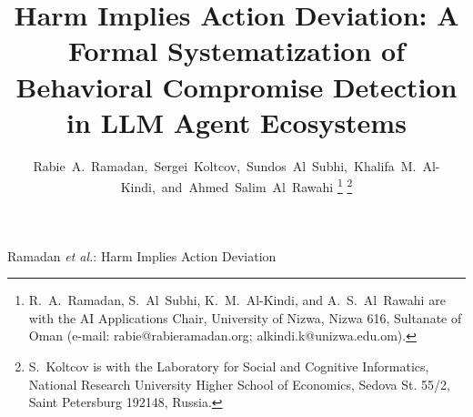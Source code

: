 \documentclass[journal]{IEEEtran}
\theoremstyle{remark}
\begin{document}
\title{Harm Implies Action Deviation: A Formal Systematization of Behavioral Compromise Detection in LLM Agent Ecosystems}

\author{%
Rabie~A.~Ramadan,~Sergei~Koltcov,~Sundos~Al~Subhi,~Khalifa~M.~Al-Kindi,~and~Ahmed~Salim~Al~Rawahi%
\thanks{R.~A.~Ramadan, S.~Al~Subhi, K.~M.~Al-Kindi, and A.~S.~Al~Rawahi are with the AI Applications Chair, University of Nizwa, Nizwa 616, Sultanate of Oman (e-mail: rabie@rabieramadan.org; alkindi.k@unizwa.edu.om).}%
\thanks{S.~Koltcov is with the Laboratory for Social and Cognitive Informatics, National Research University Higher School of Economics, Sedova St. 55/2, Saint Petersburg 192148, Russia.}%
}

%
{Ramadan \MakeLowercase{\textit{et al.}}: Harm Implies Action Deviation}

\maketitle
\end{document}
